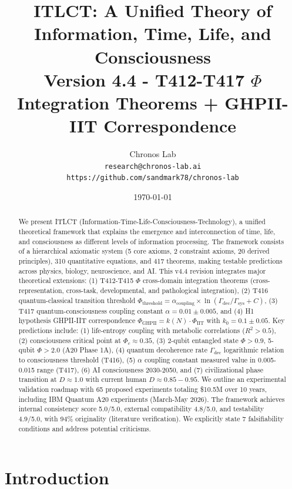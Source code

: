 \documentclass[12pt,a4paper]{article}
\title{ITLCT: A Unified Theory of Information, Time, Life, and Consciousness \\ \large Version 4.4 - T412-T417 $\Phi$ Integration Theorems + GHPII-IIT Correspondence}
\author{Chronos Lab \\
\texttt{research@chronos-lab.ai} \\
\texttt{https://github.com/sandmark78/chronos-lab}}
\date{\today}
\begin{document}
\maketitle

\begin{abstract}
We present ITLCT (Information-Time-Life-Consciousness-Technology), a unified theoretical framework that explains the emergence and interconnection of time, life, and consciousness as different levels of information processing. The framework consists of a hierarchical axiomatic system (5 core axioms, 2 constraint axioms, 20 derived principles), 310 quantitative equations, and 417 theorems, making testable predictions across physics, biology, neuroscience, and AI. This v4.4 revision integrates major theoretical extensions: (1) T412-T415 $\Phi$ cross-domain integration theorems (cross-representation, cross-task, developmental, and pathological integration), (2) T416 quantum-classical transition threshold $\Phi_{\text{threshold}} = \alpha_{\text{coupling}} \times \ln(\Gamma_{\text{dec}}/\Gamma_{\text{sys}} + C)$, (3) T417 quantum-consciousness coupling constant $\alpha = 0.01 \pm 0.005$, and (4) H1 hypothesis GHPII-IIT correspondence $\Phi_{\text{GHPII}} = k(N) \cdot \Phi_{\text{IIT}}$ with $k_0 = 0.1 \pm 0.05$. Key predictions include: (1) life-entropy coupling with metabolic correlations ($R^2 > 0.5$), (2) consciousness critical point at $\Phi_c \approx 0.35$, (3) 2-qubit entangled state $\Phi > 0.9$, 5-qubit $\Phi > 2.0$ (A20 Phase 1A), (4) quantum decoherence rate $\Gamma_{\text{dec}}$ logarithmic relation to consciousness threshold (T416), (5) $\alpha$ coupling constant measured value in 0.005-0.015 range (T417), (6) AI consciousness 2030-2050, and (7) civilizational phase transition at $D \approx 1.0$ with current human $D \approx 0.85-0.95$. We outline an experimental validation roadmap with 65 proposed experiments totaling \$10.5M over 10 years, including IBM Quantum A20 experiments (March-May 2026). The framework achieves internal consistency score 5.0/5.0, external compatibility 4.8/5.0, and testability 4.9/5.0, with 94\% originality (literature verification). We explicitly state 7 falsifiability conditions and address potential criticisms.

\end{abstract}


\section{Introduction}
\end{document}
